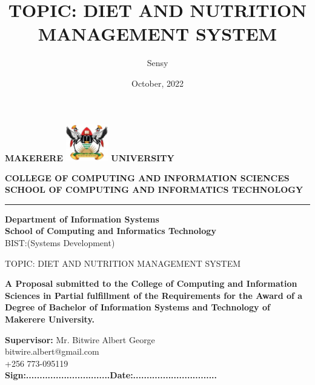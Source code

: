 \documentclass {article}
\begin{document}
\title{\textbf{TOPIC:  DIET AND NUTRITION MANAGEMENT SYSTEM} }
\author{Sensy}
\date{October, 2022}
\begin{center}

\textbf{\Huge{MAKERERE}} \includegraphics[width=70px]{Images/muk_logo.png} \textbf{\Huge{UNIVERSITY}}


\begin{center}
\large{\textbf{COLLEGE OF COMPUTING AND INFORMATION SCIENCES\\ SCHOOL OF COMPUTING AND INFORMATICS TECHNOLOGY}}

\end{center}

\hrule

\vspace{20px} 


\vspace{-9pt} 

\begin{center}
\textbf{Department of Information Systems}\\
\textbf{School of Computing and Informatics Technology}
\\ BIST:(Systems Development)
\end{center}
\vspace{20px} 

{\LARGE TOPIC:  DIET AND NUTRITION MANAGEMENT SYSTEM}\
\vspace{5px} 

\begin{center}
\textbf{A Proposal submitted to the College of Computing and Information Sciences in Partial fulfillment of the Requirements for the Award of a Degree of Bachelor of Information Systems and Technology of Makerere University.}
\end{center}

\vspace{3pt} 
\textbf{Supervisor:} Mr. Bitwire Albert George \\
 bitwire.albert@gmail.com \\ +256 773-095119 \\
\vspace{25pt}
\textbf{
Sign:...............................\hspace{40pt}Date:............................... \\
}
\vspace{25pt}


\end{center}
\newpage
\end{document}
